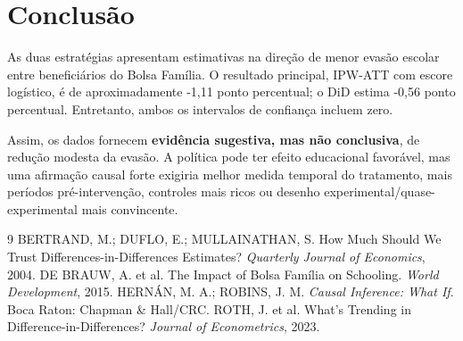 \documentclass[12pt,a4paper]{article}
\begin{document}
\section{Conclusão}

As duas estratégias apresentam estimativas na direção de menor evasão escolar entre beneficiários do Bolsa Família. O resultado principal, IPW-ATT com escore logístico, é de aproximadamente -1,11 ponto percentual; o DiD estima -0,56 ponto percentual. Entretanto, ambos os intervalos de confiança incluem zero.

Assim, os dados fornecem \textbf{evidência sugestiva, mas não conclusiva}, de redução modesta da evasão. A política pode ter efeito educacional favorável, mas uma afirmação causal forte exigiria melhor medida temporal do tratamento, mais períodos pré-intervenção, controles mais ricos ou desenho experimental/quase-experimental mais convincente.

\begin{thebibliography}{9}
 BERTRAND, M.; DUFLO, E.; MULLAINATHAN, S. How Much Should We Trust Differences-in-Differences Estimates? \textit{Quarterly Journal of Economics}, 2004.
 DE BRAUW, A. et al. The Impact of Bolsa Família on Schooling. \textit{World Development}, 2015.
 HERNÁN, M. A.; ROBINS, J. M. \textit{Causal Inference: What If}. Boca Raton: Chapman \& Hall/CRC.
 ROTH, J. et al. What's Trending in Difference-in-Differences? \textit{Journal of Econometrics}, 2023.
\end{thebibliography}
\end{document}
